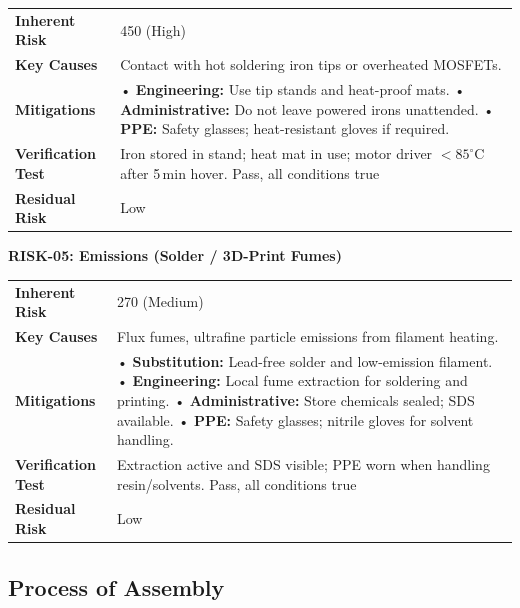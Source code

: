 \begin{tabular}{@{}p{3cm}p{13cm}@{}}
\toprule
\textbf{Inherent Risk} & 450 (High) \\
\textbf{Key Causes} & Contact with hot soldering iron tips or overheated MOSFETs. \\
\textbf{Mitigations} &
• \textbf{Engineering:} Use tip stands and heat-proof mats. \newline
• \textbf{Administrative:} Do not leave powered irons unattended. \newline
• \textbf{PPE:} Safety glasses; heat-resistant gloves if required. \\
\textbf{Verification Test} & Iron stored in stand; heat mat in use; motor driver $<85^\circ$C after 5\,min hover. Pass, all conditions true \\
\textbf{Residual Risk} & Low \\
\bottomrule
\end{tabular}
\vspace{0.6em}

\textbf{RISK-05: Emissions (Solder / 3D-Print Fumes)}

\begin{tabular}{@{}p{3cm}p{13cm}@{}}
\toprule
\textbf{Inherent Risk} & 270 (Medium) \\
\textbf{Key Causes} & Flux fumes, ultrafine particle emissions from filament heating. \\
\textbf{Mitigations} &
• \textbf{Substitution:} Lead-free solder and low-emission filament. \newline
• \textbf{Engineering:} Local fume extraction for soldering and printing. \newline
• \textbf{Administrative:} Store chemicals sealed; SDS available. \newline
• \textbf{PPE:} Safety glasses; nitrile gloves for solvent handling. \\
\textbf{Verification Test} & Extraction active and SDS visible; PPE worn when handling resin/solvents. Pass, all conditions true \\
\textbf{Residual Risk} & Low \\
\bottomrule
\end{tabular}

\pagebreak
\subsection{Process of Assembly}

